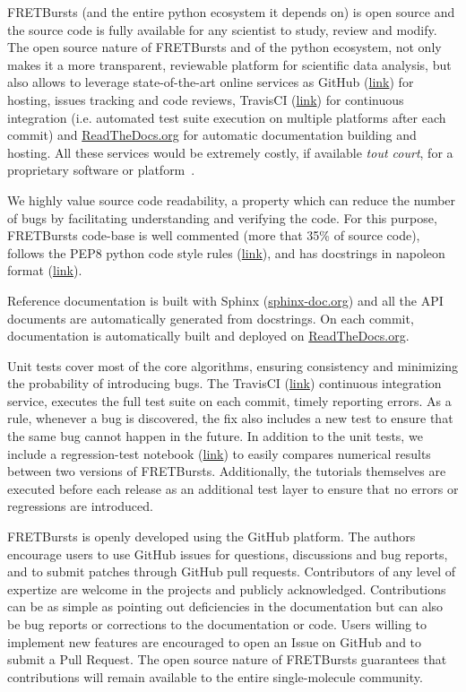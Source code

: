 FRETBursts (and the entire python ecosystem it depends on) is open source
and the source code is fully available for any scientist to study,
review and modify.
The open source nature of FRETBursts and of the python ecosystem,
not only makes it a more transparent, reviewable platform
for scientific data analysis, but also allows
to leverage state-of-the-art online services as GitHub (\href{http://https://github.com}{link}) for hosting,
issues tracking and code reviews, TravisCI
(\href{https://travis-ci.org}{link}) for continuous integration
(i.e. automated test suite execution on multiple platforms after each commit)
and \href{https://readthedocs.org/}{ReadTheDocs.org} for automatic documentation building and hosting.
All these services would be extremely costly, if available \textit{tout court},
for a proprietary software or platform~\cite{Freeman_2015}.

We highly value source code readability, a property which can 
reduce the number of bugs by facilitating understanding and verifying the code.
For this purpose, FRETBursts code-base is well commented (more that 35\%
of source code), 
follows the PEP8 python code style rules (\href{https://www.python.org/dev/peps/pep-0008/}{link}),
and has docstrings in napoleon format (\href{http://sphinxcontrib-napoleon.readthedocs.org/}{link}).

Reference documentation is built with Sphinx (\href{http://sphinx-doc.org/}{sphinx-doc.org})
and all the API documents are automatically generated from docstrings.
On each commit, documentation is automatically built and deployed on
\href{https://readthedocs.org/}{ReadTheDocs.org}.

Unit tests cover most of the core algorithms, ensuring consistency and
minimizing the probability of introducing bugs. 
The TravisCI (\href{http://travis-ci.org}{link}) continuous integration service, 
executes the full test suite on each commit, timely reporting errors.
As a rule, whenever a bug is discovered, the  fix also includes a new test
to ensure that the same bug cannot happen in the future.
In addition to the unit tests, we include a regression-test notebook
(\href{https://github.com/tritemio/FRETBursts/blob/master/notebooks/dev/tests/FRETBursts%20-%20Regression%20tests.ipynb}{link})
to easily compares numerical results between two versions of FRETBursts. 
Additionally, the tutorials themselves are executed before each release as
an additional test layer to ensure that no errors or regressions are introduced.

FRETBursts is openly developed using the GitHub platform.
The authors encourage users to use GitHub issues for questions, discussions
and bug reports, and to submit patches through GitHub pull requests.
Contributors of any level of expertize are welcome in the projects
and publicly acknowledged.
Contributions can be as simple as pointing out deficiencies in the 
documentation but can also be bug reports or corrections to 
the documentation or code. Users willing to implement
new features are encouraged to open an Issue on GitHub and to submit
a Pull Request. The open source nature of FRETBursts guarantees that
contributions will remain available to the entire single-molecule 
community.


